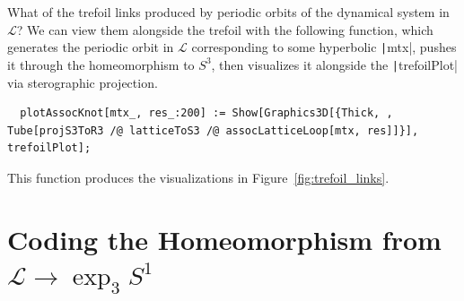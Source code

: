 \documentclass[12pt,twoside]{reedthesis}
\theoremstyle{definition}
\newcommand{\LS}{\mathcal{L}}
\begin{document}
What of the trefoil links produced by periodic orbits of the dynamical system in $\LS$?
We can view them alongside the trefoil with the following function, which generates the periodic orbit in $\LS$ corresponding to some hyperbolic \texttt|mtx|, pushes it through the homeomorphism to $S^3$, then visualizes it alongside the \texttt|trefoilPlot| via sterographic projection.
\begin{verbatim}
  plotAssocKnot[mtx_, res_:200] := Show[Graphics3D[{Thick, , Tube[projS3ToR3 /@ latticeToS3 /@ assocLatticeLoop[mtx, res]]}], trefoilPlot];
\end{verbatim}
This function produces the visualizations in Figure~\ref{fig:trefoil_links}.

\section{Coding the Homeomorphism from $\LS \to \exp_3 S^1$}\label{sec:coding_ls_to_exp}
\end{document}

